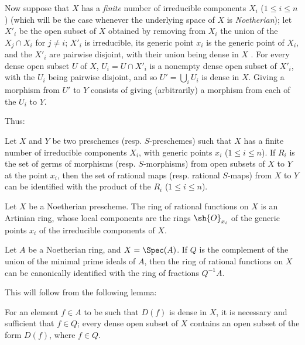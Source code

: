 \begin{env}[7.1.6]
\label{I.7.1.6}
Now suppose that $X$ has a \emph{finite} number of irreducible components $X_i$ ($1\leq i\leq n$) (which will be the case whenever the underlying space of $X$ is \emph{Noetherian}); let $X'_i$ be the open subset of $X$ obtained by removing from $X_i$ the union of the $X_j\cap X_i$ for $j\neq i$; $X'_i$ is irreducible, its generic point $x_i$ is the generic point of $X_i$, and the $X'_i$ are pairwise disjoint, with their union being dense in $X$ .
For
every dense open subset $U$ of $X$, $U_i=U\cap X'_i$ is a nonempty dense open subset of $X'_i$, with the $U_i$ being pairwise disjoint, and so $U'=\bigcup_i U_i$ is dense in $X$.
Giving a morphism from $U'$ to $Y$ consists of giving (arbitrarily) a morphism from each of the $U_i$ to $Y$.
\end{env}

Thus:
\begin{proposition}[7.1.7]
\label{I.7.1.7}
Let $X$ and $Y$ be two preschemes (resp. $S$-preschemes) such that $X$ has a finite number of irreducible components $X_i$, with generic points $x_i$ ($1\leq i\leq n$).
If $R_i$ is the set of germs of morphisms (resp. $S$-morphisms) from open subsets of $X$ to $Y$ at the point $x_i$, then the set of rational maps (resp. rational $S$-maps) from $X$ to $Y$ can be identified with the product of the $R_i$ ($1\leq i\leq n$).
\end{proposition}

\begin{corollary}[7.1.8]
\label{I.7.1.8}
Let $X$ be a Noetherian prescheme.
The ring of rational functions on $X$ is an Artinian ring, whose local components are the rings $\sh{O}_{x_i}$ of the generic points $x_i$ of the irreducible components of $X$.
\end{corollary}

\begin{corollary}[7.1.9]
\label{I.7.1.9}
Let $A$ be a Noetherian ring, and $X=\Spec(A)$.
If $Q$ is the complement of the union of the minimal prime ideals of $A$, then the ring of rational functions on $X$ can be canonically identified with the ring of fractions $Q^{-1}A$.
\end{corollary}

This will follow from the following lemma:
\begin{lemma}[7.1.9.1]
\label{I.7.1.9.1}
For an element $f\in A$ to be such that $D(f)$ is dense in $X$, it is necessary and sufficient that $f\in Q$; every dense open subset of $X$ contains an open subset of the form $D(f)$, where $f\in Q$.
\end{lemma}

